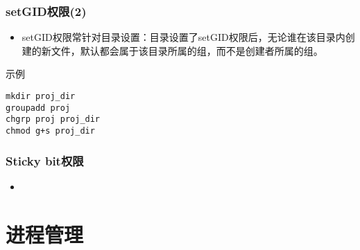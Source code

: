 \documentclass[xcolor=svgnames,presentation]{beamer}
\begin{document}
\begin{frame}[fragile]
\frametitle{setGID权限(2)}
\label{sec-2-3-4}
\begin{itemize}

\item setGID权限常针对目录设置：目录设置了setGID权限后，无论谁在该目录内创建的新文件，默认都会属于该目录所属的组，而不是创建者所属的组。
\label{sec-2-3-4-1}%
\end{itemize} %
\begin{exampleblock}{示例}
\label{sec-2-3-4-2}


\begin{verbatim}
mkdir proj_dir
groupadd proj
chgrp proj proj_dir
chmod g+s proj_dir
\end{verbatim}
\end{exampleblock}
\end{frame}
\begin{frame}
\frametitle{Sticky bit权限}
\label{sec-2-3-5}
\begin{itemize}

\item 
%
\end{itemize} %
\end{frame}
\subsection{}
\section{进程管理}
\label{sec-3}
\end{document}
